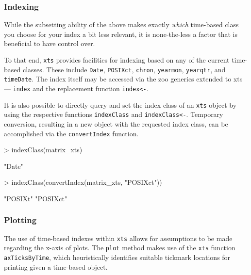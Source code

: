 \documentclass{article}
\begin{document}
\subsubsection*{Indexing}
While the subsetting ability of the above makes
exactly {\em which} time-based class you choose
for your index a bit less relevant, it is none-the-less
a factor that is beneficial to have control over.

To that end, {\tt xts} provides facilities for indexing
based on any of the current time-based classes. These
include {\tt Date}, {\tt POSIXct}, {\tt chron}, {\tt yearmon},
{\tt yearqtr}, and {\tt timeDate}.  The index itself may
be accessed via the zoo generics extended to xts --- {\tt index} and
the replacement function {\tt index<-}.

It is also possible to directly query and set the
index class of an {\tt xts} object by using the respective functions
{\tt indexClass} and {\tt indexClass<-}.
Temporary conversion, resulting in a new object with the requested
index class, can be accomplished via the {\tt convertIndex} function.

\begin{Schunk}
\begin{Sinput}
> indexClass(matrix_xts)
\end{Sinput}
\begin{Soutput}
[1] "Date"
\end{Soutput}
\begin{Sinput}
> indexClass(convertIndex(matrix_xts, "POSIXct"))
\end{Sinput}
\begin{Soutput}
[1] "POSIXt"  "POSIXct"
\end{Soutput}
\end{Schunk}
\pagebreak
\subsubsection*{Plotting}

The use of time-based indexes within {\tt xts} allows
for assumptions to be made regarding the x-axis
of plots. The {\tt plot} method
makes use of the {\tt xts} function {\tt axTicksByTime}, which
heuristically identifies suitable tickmark locations
for printing given a time-based object. 
\end{document}
